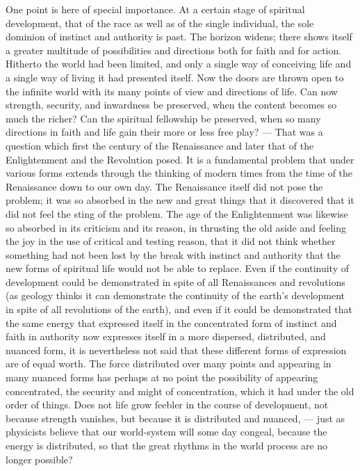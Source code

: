 \documentclass[12pt,a4paper,openany]{book}
\newcommand{\opage}[1]{\marginnote{\footnotesize\textit{[#1]}}}
\begin{document}
One point is here of special importance. At a certain stage of
spiritual development, that of the race as well as of the single individual,
the sole dominion of instinct and authority is past. The horizon
widens; there shows itself a greater multitude of possibilities and
directions both for faith and for action. Hitherto the world had
been limited, and only a single
way of conceiving life and a single way of living it had presented itself.
Now the doors are thrown open to the infinite world with its many
\opage{230}points of view and directions of life. Can now strength, security, and
inwardness be preserved, when the content becomes so much the
richer? Can the spiritual fellowship be preserved, when so
many directions in faith and life gain their more or less
free play? --- That was a question which first the century of the Renaissance and
later that of the Enlightenment and the Revolution posed.
It is a fundamental problem that under various forms extends
through the thinking of modern times from the time of the
Renaissance down to our own day. The Renaissance itself did not pose the
problem; it was so absorbed in the new and great things that it
discovered that it did not feel the sting of the problem. The age of the Enlightenment
was likewise so absorbed in its criticism and its reason,
in thrusting the old aside and feeling the joy in the
use of critical and testing reason, that it did not think
whether something had not been lost by the break with instinct and authority
that the new forms of spiritual life would not
be able to replace. Even if the continuity of development could be
demonstrated in spite of all Renaissances and revolutions (as
geology thinks it can demonstrate the continuity of
the earth's development in spite of all revolutions of the earth), and even if it could be
demonstrated that the same energy that expressed itself in the concentrated form
of instinct and faith in authority now expresses itself in a more
dispersed, distributed, and nuanced form, it is nevertheless not said
that these different forms of expression are of equal worth. The
force distributed over many points and appearing in many nuanced forms
has perhaps at no point the
possibility of appearing concentrated, the security and might of
concentration, which it had under the old order of things.
Does not life grow feebler in the course of development, not
because strength vanishes, but because it is distributed and
nuanced, --- just as physicists believe that our world-system will
some day congeal, because the energy is distributed, so that the great rhythms
in the world process are no longer possible?
\end{document}
